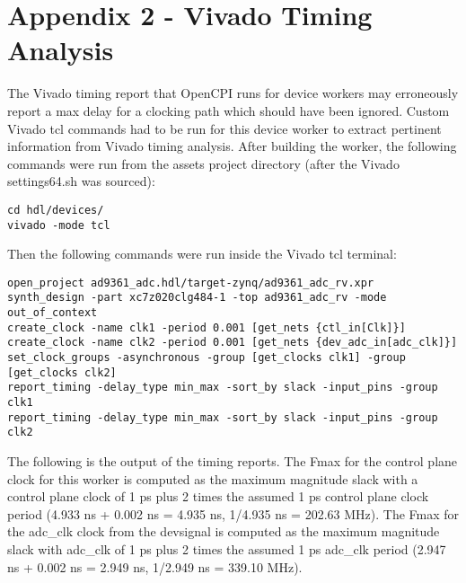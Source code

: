 \documentclass{article}
\begin{document}
\section{Appendix 2 - Vivado Timing Analysis} \label{appendix}

The Vivado timing report that OpenCPI runs for device workers may erroneously report a max delay for a clocking path which should have been ignored. Custom Vivado tcl commands had to be run for this device worker to extract pertinent information from Vivado timing analysis. After building the worker, the following commands were run from the assets project directory (after the Vivado settings64.sh was sourced):
\begin{lstlisting}
cd hdl/devices/
vivado -mode tcl
\end{lstlisting}
Then the following commands were run inside the Vivado tcl terminal:
\begin{lstlisting}
open_project ad9361_adc.hdl/target-zynq/ad9361_adc_rv.xpr
synth_design -part xc7z020clg484-1 -top ad9361_adc_rv -mode out_of_context
create_clock -name clk1 -period 0.001 [get_nets {ctl_in[Clk]}]
create_clock -name clk2 -period 0.001 [get_nets {dev_adc_in[adc_clk]}]
set_clock_groups -asynchronous -group [get_clocks clk1] -group [get_clocks clk2]
report_timing -delay_type min_max -sort_by slack -input_pins -group clk1
report_timing -delay_type min_max -sort_by slack -input_pins -group clk2
\end{lstlisting}
The following is the output of the timing reports. The Fmax for the control plane clock for this worker is computed as the maximum magnitude slack with a control plane clock of 1 ps plus 2 times the assumed 1 ps control plane clock period (4.933 ns + 0.002 ns = 4.935 ns, 1/4.935 ns = 202.63 MHz). The Fmax for the adc\_clk clock from the devsignal is computed as the maximum magnitude slack with adc\_clk of 1 ps plus 2 times the assumed 1 ps adc\_clk period (2.947 ns + 0.002 ns = 2.949 ns, 1/2.949 ns = 339.10 MHz).
\fontsize{6}{12}\selectfont
\end{document}
